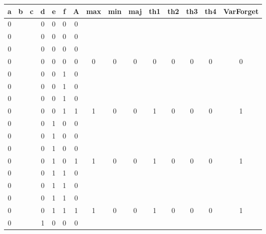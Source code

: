 \begin{table}[!tb]
    \centering
    \begin{tabular}{|c|c|c|c|c|c|c|c|c|c|c|c|c|c|c|}
        \hline
        \textbf{a} & \textbf{b} & \textbf{c} & \textbf{d} & \textbf{e} & \textbf{f} & \textbf{A} & \textbf{max} & \textbf{min} & \textbf{maj} & \textbf{th1} & \textbf{th2} & \textbf{th3} & \textbf{th4} & \textbf{VarForget} \\ \hline
        \rowcolor{gray!40} 0 &  &  & 0 & 0 & 0 & 0 &  &  &  &  &  &  &  &  \\ \hline
        \rowcolor{gray!40} 0 &  &  & 0 & 0 & 0 & 0 &  &  &  &  &  &  &  &  \\ \hline
        \rowcolor{gray!40} 0 &  &  & 0 & 0 & 0 & 0 &  &  &  &  &  &  &  &  \\ \hline
        \rowcolor{gray!40} 0 &  &  & 0 & 0 & 0 & 0 & 0 & 0 & 0 & 0 & 0 & 0 & 0 & 0 \\ \hline
        \rowcolor{blue!40} 0 &  &  & 0 & 0 & 1 & 0 &  &  &  &  &  &  &  &  \\ \hline
        \rowcolor{blue!40} 0 &  &  & 0 & 0 & 1 & 0 &  &  &  &  &  &  &  &  \\ \hline
        \rowcolor{blue!40} 0 &  &  & 0 & 0 & 1 & 0 &  &  &  &  &  &  &  &  \\ \hline
        \rowcolor{blue!40} 0 &  &  & 0 & 0 & 1 & 1 & 1 & 0 & 0 & 1 & 0 & 0 & 0 & 1 \\ \hline
        \rowcolor{red!40} 0 &  &  & 0 & 1 & 0 & 0 &  &  &  &  &  &  &  &  \\ \hline
        \rowcolor{red!40} 0 &  &  & 0 & 1 & 0 & 0 &  &  &  &  &  &  &  &  \\ \hline
        \rowcolor{red!40} 0 &  &  & 0 & 1 & 0 & 0 &  &  &  &  &  &  &  &  \\ \hline
        \rowcolor{red!40} 0 &  &  & 0 & 1 & 0 & 1 & 1 & 0 & 0 & 1 & 0 & 0 & 0 & 1 \\ \hline
        \rowcolor{green!40} 0 &  &  & 0 & 1 & 1 & 0 &  &  &  &  &  &  &  &  \\ \hline
        \rowcolor{green!40} 0 &  &  & 0 & 1 & 1 & 0 &  &  &  &  &  &  &  &  \\ \hline
        \rowcolor{green!40} 0 &  &  & 0 & 1 & 1 & 0 &  &  &  &  &  &  &  &  \\ \hline
        \rowcolor{green!40} 0 &  &  & 0 & 1 & 1 & 1 & 1 & 0 & 0 & 1 & 0 & 0 & 0 & 1 \\ \hline
        \rowcolor{yellow!40} 0 &  &  & 1 & 0 & 0 & 0 &  &  &  &  &  &  &  &  \\ \hline

\end{tabular}
\end{table}
